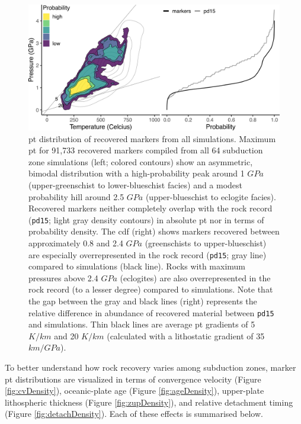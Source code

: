 \begin{figure}[htbp]

{\centering \includegraphics[width=1\linewidth,]{assets/figs/chpt4/meta} 

}

\caption[\gls{pt} distribution of recovered markers from all simulations]{\gls{pt} distribution of recovered markers from all simulations. Maximum \gls{pt} for 91,733 recovered markers compiled from all 64 subduction zone simulations (left; colored contours) show an asymmetric, bimodal distribution with a high-probability peak around 1 \(GPa\) (upper-greenschist to lower-blueschist facies) and a modest probability hill around 2.5 \(GPa\) (upper-blueschist to eclogite facies). Recovered markers neither completely overlap with the rock record (\texttt{pd15}; light gray density contours) in absolute \gls{pt} nor in terms of probability density. The \gls{cdf} (right) shows markers recovered between approximately 0.8 and 2.4 \(GPa\) (greenschists to upper-blueschist) are especially overrepresented in the rock record (\texttt{pd15}; gray line) compared to simulations (black line). Rocks with maximum pressures above 2.4 \(GPa\) (eclogites) are also overrepresented in the rock record (to a lesser degree) compared to simulations. Note that the gap between the gray and black lines (right) represents the relative difference in abundance of recovered material between \texttt{pd15} and simulations. Thin black lines are average \gls{pt} gradients of 5 \(K/km\) and 20 \(K/km\) (calculated with a lithostatic gradient of 35 \(km/GPa\)).}\label{fig:meta}
\end{figure}

To better understand how rock recovery varies among subduction zones, marker \gls{pt} distributions are visualized in terms of convergence velocity (Figure \ref{fig:cvDensity}), oceanic-plate age (Figure \ref{fig:ageDensity}), upper-plate lithospheric thickness (Figure \ref{fig:zupDensity}), and relative detachment timing (Figure \ref{fig:detachDensity}). Each of these effects is summarised below.

